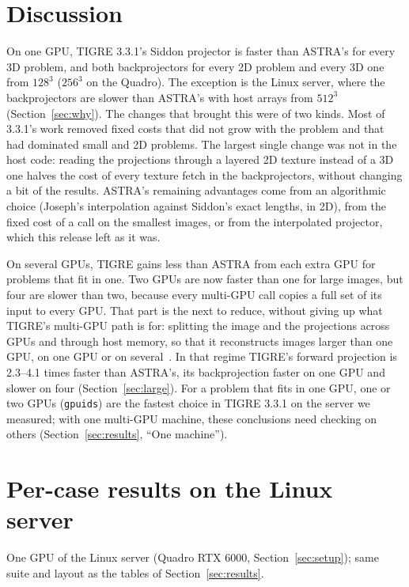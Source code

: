 \documentclass[11pt,a4paper]{article}
\begin{document}
\section{Discussion}
On one GPU, TIGRE 3.3.1's Siddon projector is faster than ASTRA's for every 3D problem, and both backprojectors
for every 2D problem and every 3D one from $128^3$ ($256^3$ on the Quadro). The exception is the Linux server,
where the backprojectors are slower than ASTRA's with host arrays from $512^3$ (Section~\ref{sec:why}). The changes that
brought this were of two kinds. Most of 3.3.1's work removed fixed costs that did not grow with the problem and
that had dominated small and 2D problems. The largest single change was not in the host code: reading the
projections through a layered 2D texture instead of a 3D one halves the cost of every texture fetch in the
backprojectors, without changing a bit of the results. ASTRA's remaining advantages come from an algorithmic
choice (Joseph's interpolation against Siddon's exact lengths, in 2D), from the fixed cost of a call on the
smallest images, or from the interpolated projector, which this release left as it was.

On several GPUs, TIGRE gains less than ASTRA from each extra GPU for problems that fit in one. Two GPUs are now
faster than one for large images, but four are slower than two, because every multi-GPU call copies a full set of
its input to every GPU. That part is the next to reduce, without giving up what TIGRE's multi-GPU path is for:
splitting the image and the projections across GPUs and through host memory, so that it reconstructs images
larger than one GPU, on one GPU or on several~\cite{tigre2020multigpu}. In that regime TIGRE's forward projection
is 2.3--4.1 times faster than ASTRA's, its backprojection faster on one GPU and slower on four
(Section~\ref{sec:large}). For a problem that fits in one GPU, one or two GPUs (\texttt{gpuids}) are the fastest
choice in TIGRE 3.3.1 on the server we measured; with one multi-GPU machine, these conclusions need checking on
others (Section~\ref{sec:results}, ``One machine'').

\appendix
\section{Per-case results on the Linux server}\label{app:linux}
One GPU of the Linux server (Quadro RTX 6000, Section~\ref{sec:setup}); same suite and layout as the tables of
Section~\ref{sec:results}.
\end{document}
